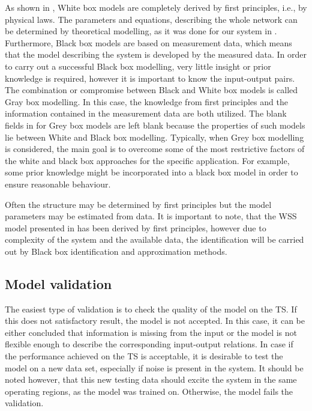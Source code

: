 As shown in , White box models are completely derived by first principles, i.e., by physical laws. The parameters and equations, describing the whole network can be determined by theoretical modelling, as it was done for our system in . Furthermore, Black box models are based on measurement data, which means that the model describing the system is developed by the measured data. In order to carry out a successful Black box modelling, very little insight or prior knowledge is required, however it is important to know the input-output pairs. The combination or compromise between Black and White box models is called Gray box modelling. In this case, the knowledge from first principles and the information contained in the measurement data are both utilized. The blank fields in  for Grey box models are left blank because the properties of such models lie between White and Black box modelling. Typically, when Grey box modelling is considered, the main goal is to overcome some of the most restrictive factors of the white and black box approaches for the specific application. For example, some prior knowledge might be incorporated into a black box model in order to ensure reasonable behaviour\cite{nelles2013nonlinear}. 

Often the structure may be determined by first principles but the model parameters may be estimated from data. It is important to note, that the WSS model presented in  has been derived by first principles, however due to complexity of the system and the available data, the identification will be carried out by Black box identification and approximation methods. 

\subsection{Model validation}
\label{model_validation}

The easiest type of validation is to check the quality of the model on the TS. If this does not satisfactory result, the model is not accepted. In this case, it can be either concluded that information is missing from the input or the model is not flexible enough to describe the corresponding input-output relations. In case if the performance achieved on the TS is acceptable, it is desirable to test the model on a new data set, especially if noise is present in the system. It should be noted however, that this new testing data should excite the system in the same operating regions, as the model was trained on. Otherwise, the model fails the validation. 


